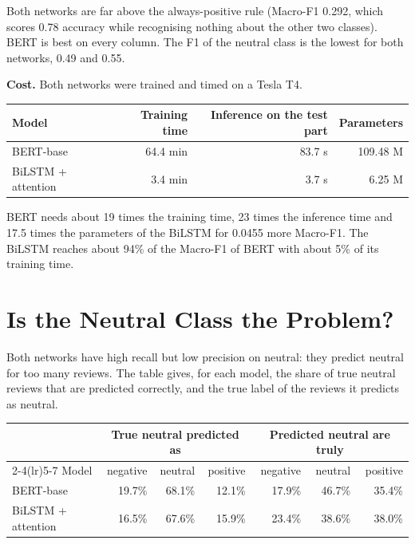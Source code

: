 Both networks are far above the always-positive rule (Macro-F1 0.292, which scores 0.78 accuracy while recognising nothing about the other two classes). BERT is best on every column. The F1 of the neutral class is the lowest for both networks, 0.49 and 0.55.

\textbf{Cost.} Both networks were trained and timed on a Tesla T4.

\begin{center}
\small
\begin{tabular}{@{}lrrr@{}}
    \toprule
    Model & Training time & Inference on the test part & Parameters \\
    \midrule
    BERT-base & 64.4 min & 83.7 s & 109.48 M \\
    BiLSTM + attention & 3.4 min & 3.7 s & 6.25 M \\
    \bottomrule
\end{tabular}
\end{center}

BERT needs about 19 times the training time, 23 times the inference time and 17.5 times the parameters of the BiLSTM for 0.0455 more Macro-F1. The BiLSTM reaches about 94\% of the Macro-F1 of BERT with about 5\% of its training time.

\section{Is the Neutral Class the Problem?}
\label{sec:7-3}

Both networks have high recall but low precision on neutral: they predict neutral for too many reviews. The table gives, for each model, the share of true neutral reviews that are predicted correctly, and the true label of the reviews it predicts as neutral.

\begin{center}
\small
\begin{tabular}{@{}lrrrrrr@{}}
    \toprule
     & \multicolumn{3}{c}{True neutral predicted as} & \multicolumn{3}{c}{Predicted neutral are truly} \\
    \cmidrule(lr){2-4}\cmidrule(lr){5-7}
    Model & negative & neutral & positive & negative & neutral & positive \\
    \midrule
    BERT-base & 19.7\% & 68.1\% & 12.1\% & 17.9\% & 46.7\% & 35.4\% \\
    BiLSTM + attention & 16.5\% & 67.6\% & 15.9\% & 23.4\% & 38.6\% & 38.0\% \\
    \bottomrule
\end{tabular}
\end{center}

